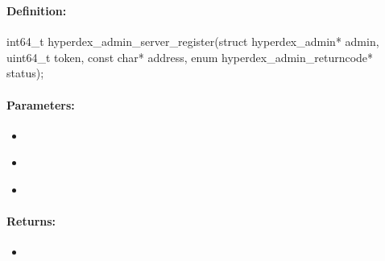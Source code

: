 \pagebreak
\subsubsection{}
\label{api:c:server_register}


\paragraph{Definition:}
\begin{ccode}
int64_t hyperdex_admin_server_register(struct hyperdex_admin* admin,
        uint64_t token,
        const char* address,
        enum hyperdex_admin_returncode* status);
\end{ccode}

\paragraph{Parameters:}
\begin{itemize}[noitemsep]
\item {}\\

\item {}\\

\item {}\\

\end{itemize}

\paragraph{Returns:}
\begin{itemize}[noitemsep]
\item {}\\

\end{itemize}

\pagebreak
\subsubsection{}
\label{api:c:server_online}


